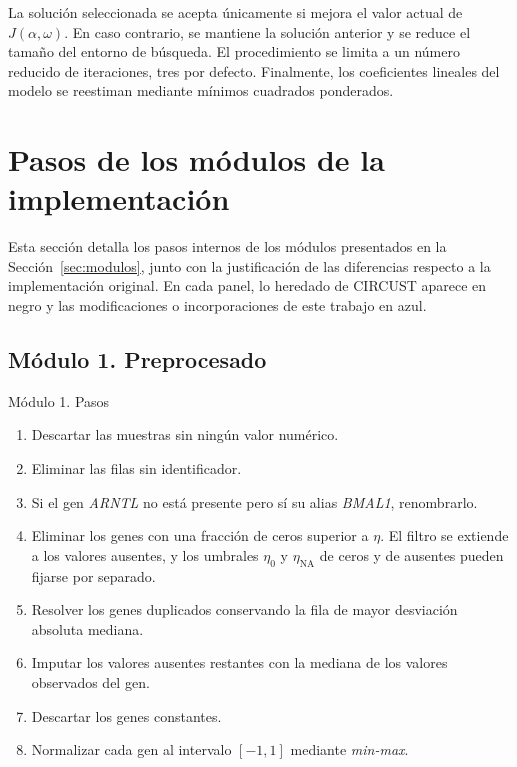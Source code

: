 \documentclass[12pt, a4paper]{report}
\newcommand{\nuevo}[1]{\textcolor{cnuevo}{#1}}
\newenvironment{pasos}{\begin{enumerate}[nosep,leftmargin=1.5em,label=\arabic*.]}{\end{enumerate}}
\begin{document}
La solución seleccionada se acepta únicamente si mejora el valor actual de \(J(\alpha,\omega)\). En caso contrario, se mantiene la solución anterior y se reduce el tamaño del entorno de búsqueda. El procedimiento se limita a un número reducido de iteraciones, tres por defecto.
Finalmente, los coeficientes lineales del modelo se reestiman mediante mínimos cuadrados ponderados.

\section{Pasos de los módulos de la implementación}
\label{sec:PasosModulos}

Esta sección detalla los pasos internos de los módulos presentados en la Sección~\ref{sec:modulos}, junto con la justificación de las diferencias respecto a la implementación original. En cada panel, lo heredado de CIRCUST aparece en negro y las modificaciones o incorporaciones de este trabajo en \nuevo{azul}.

\subsection{Módulo 1. Preprocesado}

\begin{panel}{Módulo 1. Pasos}
\begin{pasos}
\item \nuevo{Descartar las muestras sin ningún valor numérico.}
\item Eliminar las filas sin identificador.
\item \nuevo{Si el gen \textit{ARNTL} no está presente pero sí su alias \textit{BMAL1}, renombrarlo.}
\item Eliminar los genes con una fracción de ceros superior a \(\eta\). \nuevo{El filtro se extiende a los valores ausentes, y los umbrales \(\eta_0\) y \(\eta_{\mathrm{NA}}\) de ceros y de ausentes pueden fijarse por separado.}
\item \nuevo{Resolver los genes duplicados conservando la fila de mayor desviación absoluta mediana.}
\item \nuevo{Imputar los valores ausentes restantes con la mediana de los valores observados del gen.}
\item \nuevo{Descartar los genes constantes.}
\item Normalizar cada gen al intervalo \([-1,1]\) mediante \textit{min-max}.
\end{pasos}
\end{panel}
\end{document}
